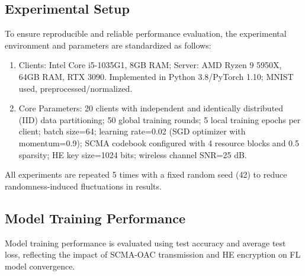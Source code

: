 \documentclass[runningheads]{llncs}
\begin{document}
\subsection{Experimental Setup}
To ensure reproducible and reliable performance evaluation, the experimental environment and parameters are standardized as follows:
\begin{enumerate}

\item Clients: Intel Core i5-1035G1, 8GB RAM; Server: AMD Ryzen 9 5950X, 64GB RAM, RTX 3090. Implemented in Python 3.8/PyTorch 1.10; MNIST used, preprocessed/normalized.
\item Core Parameters: 20 clients with independent and identically distributed (IID) data partitioning; 50 global training rounds; 5 local training epochs per client; batch size=64; learning rate=0.02 (SGD optimizer with momentum=0.9); SCMA codebook configured with 4 resource blocks and 0.5 sparsity; HE key size=1024 bits; wireless channel SNR=25 dB.
\end{enumerate}

All experiments are repeated 5 times with a fixed random seed (42) to reduce randomness-induced fluctuations in results.
\subsection{Model Training Performance}
Model training performance is evaluated using test accuracy and average test loss, reflecting the impact of SCMA-OAC transmission and HE encryption on FL model convergence.
\end{document}
